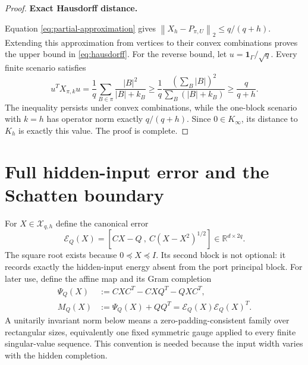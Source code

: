\documentclass[journal,10pt]{IEEEtran}
\theoremstyle{definition}
\theoremstyle{remark}
\newcommand{\R}{\mathbb R}
\newcommand{\one}{\mathbf 1}
\newcommand{\cX}{\mathcal X}
\newcommand{\cE}{\mathcal E}
\newcommand{\norm}[1]{\left\lVert #1\right\rVert}
\begin{document}
\begin{proof}
\par\smallskip\noindent\textbf{Exact Hausdorff distance.}\par\nobreak
\noindent Equation \eqref{eq:partial-approximation} gives
$\norm{X_h-P_{\pi,U}}_2\leq q/(q+h)$.  Extending this approximation from
vertices to their convex combinations proves the upper bound in
\eqref{eq:hausdorff}.  For the reverse bound, let
$u=\one_\Gamma/\sqrt q$.  Every finite scenario satisfies
\begin{equation}
 u^TX_{\pi,k}u
 =\frac1q\sum_{B\in\pi}\frac{|B|^2}{|B|+k_B}
 \geq\frac1q\frac{(\sum_B|B|)^2}{\sum_B(|B|+k_B)}
 \geq\frac{q}{q+h}.
 \label{eq:hausdorff-lower}
\end{equation}
The inequality persists under convex combinations, while the one-block
scenario with $k=h$ has operator norm exactly $q/(q+h)$.  Since
$0\in K_\infty$, its distance to $K_h$ is exactly this value.  The proof is
complete.
\end{proof}

\section{Full hidden-input error and the Schatten boundary}

For $X\in\cX_{q,h}$ define the canonical error
\begin{equation}
  \cE_Q(X)
  =\left[CX-Q\ ,\ C(X-X^2)^{1/2}\right]
  \in\R^{d\times2q}.
  \label{eq:canonical-error}
\end{equation}
The square root exists because $0\preceq X\preceq I$.  Its second block is
not optional: it records exactly the hidden-input energy absent from the port
principal block.
For later use, define the affine map and its Gram completion
\begin{align}
 \Psi_Q(X)&:=CXC^T-CXQ^T-QXC^T,\label{eq:psi}\\
 M_Q(X)&:=\Psi_Q(X)+QQ^T
          =\cE_Q(X)\cE_Q(X)^T.\label{eq:Mq}
\end{align}
A unitarily invariant norm below means a zero-padding-consistent family over
rectangular sizes, equivalently one fixed symmetric gauge applied to every
finite singular-value sequence.  This convention is needed because the input
width varies with the hidden completion.
\end{document}
